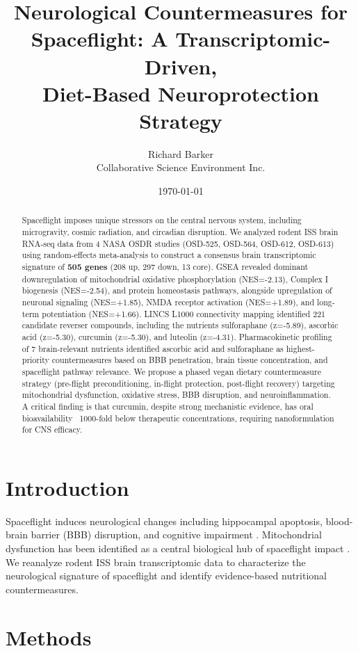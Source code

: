 \documentclass[11pt,a4paper]{article}
\title{Neurological Countermeasures for Spaceflight: A Transcriptomic-Driven, \\
       Diet-Based Neuroprotection Strategy}
\author{Richard Barker \\ \small Collaborative Science Environment Inc.}
\date{\today}
\begin{document}
\maketitle

\begin{abstract}
Spaceflight imposes unique stressors on the central nervous system, including microgravity, cosmic radiation, and circadian disruption. We analyzed rodent ISS brain RNA-seq data from 4 NASA OSDR studies (OSD-525, OSD-564, OSD-612, OSD-613) using random-effects meta-analysis to construct a consensus brain transcriptomic signature of \textbf{505 genes} (208 up, 297 down, 13 core). GSEA revealed dominant downregulation of mitochondrial oxidative phosphorylation (NES=-2.13), Complex I biogenesis (NES=-2.54), and protein homeostasis pathways, alongside upregulation of neuronal signaling (NES=+1.85), NMDA receptor activation (NES=+1.89), and long-term potentiation (NES=+1.66). LINCS L1000 connectivity mapping identified 221 candidate reverser compounds, including the nutrients sulforaphane (z=-5.89), ascorbic acid (z=-5.30), curcumin (z=-5.30), and luteolin (z=-4.31). Pharmacokinetic profiling of 7 brain-relevant nutrients identified ascorbic acid and sulforaphane as highest-priority countermeasures based on BBB penetration, brain tissue concentration, and spaceflight pathway relevance. We propose a phased vegan dietary countermeasure strategy (pre-flight preconditioning, in-flight protection, post-flight recovery) targeting mitochondrial dysfunction, oxidative stress, BBB disruption, and neuroinflammation. A critical finding is that curcumin, despite strong mechanistic evidence, has oral bioavailability ~1000-fold below therapeutic concentrations, requiring nanoformulation for CNS efficacy.
\end{abstract}

\section{Introduction}
Spaceflight induces neurological changes including hippocampal apoptosis, blood-brain barrier (BBB) disruption, and cognitive impairment \citep{Mao2020,Afshinnekoo2020}. Mitochondrial dysfunction has been identified as a central biological hub of spaceflight impact \citep{daSilveira2020}. We reanalyze rodent ISS brain transcriptomic data to characterize the neurological signature of spaceflight and identify evidence-based nutritional countermeasures.

\section{Methods}
\end{document}
